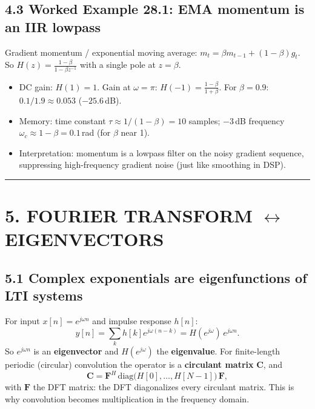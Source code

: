 \documentclass[11pt,a4paper]{article}
\begin{document}
\subsection{4.3 Worked Example 28.1: EMA momentum is an IIR lowpass}
Gradient momentum / exponential moving average: $m_t = \beta m_{t-1} + (1-\beta) g_t$. So $H(z) = \frac{1-\beta}{1-\beta z^{-1}}$ with a single pole at $z=\beta$.
\begin{itemize}
    \item DC gain: $H(1) = 1$. Gain at $\omega=\pi$: $H(-1) = \frac{1-\beta}{1+\beta}$. For $\beta=0.9$: $0.1/1.9 \approx 0.053$ ($-25.6$\,dB).
    \item Memory: time constant $\tau \approx 1/(1-\beta) = 10$ samples; $-3$\,dB frequency $\omega_c \approx 1-\beta=0.1$\,rad (for $\beta$ near 1).
    \item Interpretation: momentum is a lowpass filter on the noisy gradient sequence, suppressing high-frequency gradient noise (just like smoothing in DSP).
\end{itemize}

\noindent\rule{\textwidth}{0.5pt}

\section{5. FOURIER TRANSFORM $\leftrightarrow$ EIGENVECTORS}

\subsection{5.1 Complex exponentials are eigenfunctions of LTI systems}
For input $x[n] = e^{j\omega n}$ and impulse response $h[n]$:
\begin{equation}
y[n] = \sum_k h[k]e^{j\omega(n-k)} = H(e^{j\omega})\,e^{j\omega n}.
\end{equation}
So $e^{j\omega n}$ is an \textbf{eigenvector} and $H(e^{j\omega})$ the \textbf{eigenvalue}. For finite-length periodic (circular) convolution the operator is a \textbf{circulant matrix} $\mathbf{C}$, and
\begin{equation}
\mathbf{C} = \mathbf{F}^{H}\,\mathrm{diag}\big(H[0],\dots,H[N-1]\big)\,\mathbf{F},
\end{equation}
with $\mathbf{F}$ the DFT matrix: the DFT diagonalizes every circulant matrix. This is why convolution becomes multiplication in the frequency domain.
\end{document}
